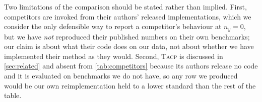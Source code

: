 Two limitations of the comparison should be stated rather than implied. First, competitors are
invoked from their authors' released implementations, which we consider the only defensible way
to report a competitor's behaviour at $n_y=0$, but we have \emph{not} reproduced their published
numbers on their own benchmarks; our claim is about what their code does on our data, not about
whether we have implemented their method as they would. Second, \textsc{Tacp} \cite{liu2026tail}
is discussed in \cref{sec:related} and absent from \cref{tab:competitors} because its authors
release no code and it is evaluated on benchmarks we do not have, so any row we produced would
be our own reimplementation held to a lower standard than the rest of the table.
